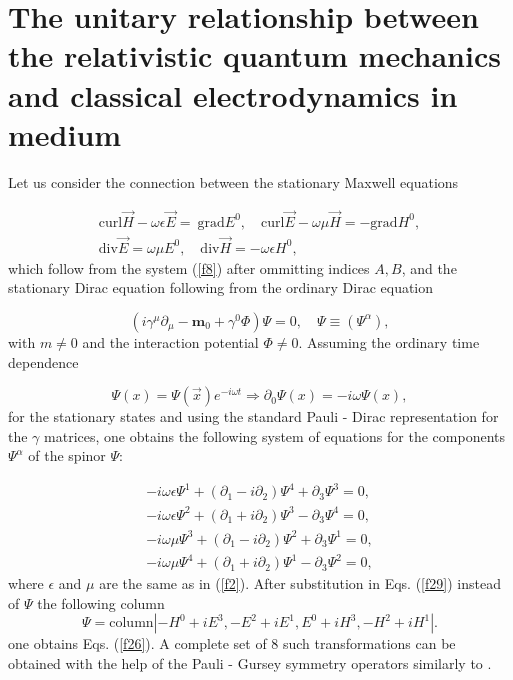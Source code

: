\documentclass[a4paper,12pt]{article}
\begin{document}
\section{The unitary relationship between the relativistic quantum mechanics
and classical electrodynamics in medium}

Let us consider the connection between the stationary Maxwell equations

\begin{equation}
\begin{array}{c}
\mathrm{curl}\overrightarrow{H}-\omega \epsilon \overrightarrow{E}=\mathrm{\
grad}E^0,\quad \mathrm{curl}\overrightarrow{E}-\omega \mu \overrightarrow{H}%
=-\mathrm{grad}H^0, \\
\mathrm{div}\overrightarrow{E}=\omega \mu E^0,\quad \mathrm{div}%
\overrightarrow{H}=-\omega \epsilon H^0,
\end{array}
\label{f26}
\end{equation}
which follow from the system (\ref{f8}) after ommitting indices $A,B$, and
the stationary Dirac equation following from the ordinary Dirac equation

\begin{equation}
\left( i\gamma ^\mu \partial _\mu -\mathbf{m}_0+\gamma ^0\Phi \right) \Psi
=0, \quad \Psi \equiv (\Psi ^\alpha ),  \label{f27}
\end{equation}
with $m\neq 0$ and the interaction potential $\Phi \neq 0.$ Assuming the
ordinary time dependence

\begin{equation}
\Psi (x)=\Psi (\overrightarrow{x})e^{-i\omega t}\Longrightarrow \partial
_0\Psi (x)=-i\omega \Psi (x),  \label{f28}
\end{equation}
for the stationary states and using the standard Pauli - Dirac
representation for the $\gamma $ matrices, one obtains the following system
of equations for the components $\Psi ^\alpha $ of the spinor $\Psi $:

\begin{equation}
\begin{array}{c}
-i\omega \epsilon \Psi ^1+(\partial _1-i\partial _2)\Psi ^4+\partial _3\Psi
^3=0, \\
-i\omega \epsilon \Psi ^2+(\partial _1+i\partial _2)\Psi ^3-\partial _3\Psi
^4=0, \\
-i\omega \mu \Psi ^3+(\partial _1-i\partial _2)\Psi ^2+\partial _3\Psi ^1=0,
\\
-i\omega \mu \Psi ^4+(\partial _1+i\partial _2)\Psi ^1-\partial _3\Psi ^2=0,
\end{array}
\label{f29}
\end{equation}
where $\epsilon $ and $\mu $ are the same as in (\ref{f2}). After
substitution in Eqs. (\ref{f29}) instead of $\Psi $ the following column
\begin{equation}
\Psi =\mathrm{column}\left| -H^0+iE^3,-E^2+iE^1,E^0+iH^3,-H^2+iH^1\right| .
\label{f30}
\end{equation}
one obtains Eqs. (\ref{f26}). A complete set of 8 such transformations can
be obtained with the help of the Pauli - Gursey symmetry operators \cite{IBR}
similarly to \cite{S2}.
\end{document}
